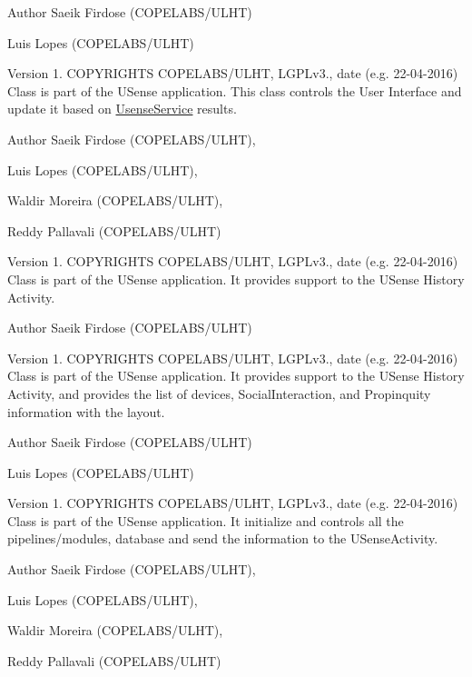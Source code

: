 \begin{DoxyAuthor}{Author}
Saeik Firdose (C\+O\+P\+E\+L\+A\+B\+S/\+U\+L\+H\+T) 

Luis Lopes (C\+O\+P\+E\+L\+A\+B\+S/\+U\+L\+H\+T)
\end{DoxyAuthor}
\begin{DoxyVersion}{Version}
1. C\+O\+P\+Y\+R\+I\+G\+H\+T\+S C\+O\+P\+E\+L\+A\+B\+S/\+U\+L\+H\+T, L\+G\+P\+Lv3., date (e.\+g. 22-\/04-\/2016) Class is part of the U\+Sense application. This class controls the User Interface and update it based on \hyperlink{classcs_1_1usense_1_1_usense_service}{Usense\+Service} results. 
\end{DoxyVersion}
\begin{DoxyAuthor}{Author}
Saeik Firdose (C\+O\+P\+E\+L\+A\+B\+S/\+U\+L\+H\+T), 

Luis Lopes (C\+O\+P\+E\+L\+A\+B\+S/\+U\+L\+H\+T), 

Waldir Moreira (C\+O\+P\+E\+L\+A\+B\+S/\+U\+L\+H\+T), 

Reddy Pallavali (C\+O\+P\+E\+L\+A\+B\+S/\+U\+L\+H\+T)
\end{DoxyAuthor}
\begin{DoxyVersion}{Version}
1. C\+O\+P\+Y\+R\+I\+G\+H\+T\+S C\+O\+P\+E\+L\+A\+B\+S/\+U\+L\+H\+T, L\+G\+P\+Lv3., date (e.\+g. 22-\/04-\/2016) Class is part of the U\+Sense application. It provides support to the U\+Sense History Activity. 
\end{DoxyVersion}
\begin{DoxyAuthor}{Author}
Saeik Firdose (C\+O\+P\+E\+L\+A\+B\+S/\+U\+L\+H\+T)
\end{DoxyAuthor}
\begin{DoxyVersion}{Version}
1. C\+O\+P\+Y\+R\+I\+G\+H\+T\+S C\+O\+P\+E\+L\+A\+B\+S/\+U\+L\+H\+T, L\+G\+P\+Lv3., date (e.\+g. 22-\/04-\/2016) Class is part of the U\+Sense application. It provides support to the U\+Sense History Activity, and provides the list of devices, Social\+Interaction, and Propinquity information with the layout. 
\end{DoxyVersion}
\begin{DoxyAuthor}{Author}
Saeik Firdose (C\+O\+P\+E\+L\+A\+B\+S/\+U\+L\+H\+T) 

Luis Lopes (C\+O\+P\+E\+L\+A\+B\+S/\+U\+L\+H\+T)
\end{DoxyAuthor}
\begin{DoxyVersion}{Version}
1. C\+O\+P\+Y\+R\+I\+G\+H\+T\+S C\+O\+P\+E\+L\+A\+B\+S/\+U\+L\+H\+T, L\+G\+P\+Lv3., date (e.\+g. 22-\/04-\/2016) Class is part of the U\+Sense application. It initialize and controls all the pipelines/modules, database and send the information to the U\+Sense\+Activity. 
\end{DoxyVersion}
\begin{DoxyAuthor}{Author}
Saeik Firdose (C\+O\+P\+E\+L\+A\+B\+S/\+U\+L\+H\+T), 

Luis Lopes (C\+O\+P\+E\+L\+A\+B\+S/\+U\+L\+H\+T), 

Waldir Moreira (C\+O\+P\+E\+L\+A\+B\+S/\+U\+L\+H\+T), 

Reddy Pallavali (C\+O\+P\+E\+L\+A\+B\+S/\+U\+L\+H\+T) 
\end{DoxyAuthor}
